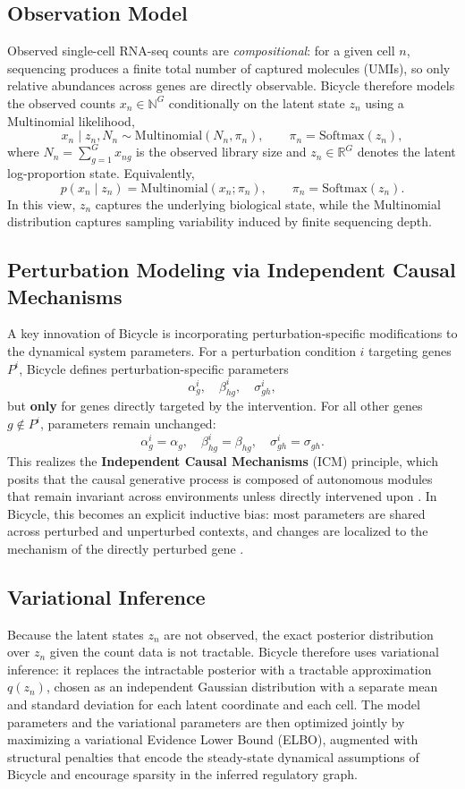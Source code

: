 \documentclass[12pt]{article}
\begin{document}
\subsection{Observation Model}
Observed single-cell RNA-seq counts are \emph{compositional}: for a given cell \(n\), sequencing produces a finite
total number of captured molecules (UMIs), so only relative abundances across genes are directly
observable. Bicycle therefore models the observed counts \(x_n \in \mathbb{N}^G\) conditionally on the
latent state \(z_n\) using a Multinomial likelihood,
\[
x_n \mid z_n, N_n \sim \mathrm{Multinomial}(N_n,\pi_n),
\qquad
\pi_n = \mathrm{Softmax}(z_n),
\]
where \(N_n = \sum_{g=1}^G x_{ng}\) is the observed library size and \(z_n \in \mathbb{R}^G\) denotes the
latent log-proportion state. Equivalently,
\[
p(x_n \mid z_n) = \mathrm{Multinomial}(x_n; \pi_n),
\qquad
\pi_n = \mathrm{Softmax}(z_n).
\]
In this view, \(z_n\) captures the underlying biological state, while the Multinomial distribution
captures sampling variability induced by finite sequencing depth.

\subsection{Perturbation Modeling via Independent Causal Mechanisms}
A key innovation of Bicycle is incorporating perturbation-specific modifications to the dynamical
system parameters. For a perturbation condition \(i\) targeting genes \(P^i\), Bicycle defines
perturbation-specific parameters
\[
\alpha^i_g, \quad
\beta^i_{hg}, \quad
\sigma^i_{gh},
\]
but \textbf{only} for genes directly targeted by the intervention. For all other genes
\(g \notin P^i\), parameters remain unchanged:
\[
\alpha^i_g = \alpha_g,\quad
\beta^i_{hg} = \beta_{hg},\quad
\sigma^i_{gh} = \sigma_{gh}.
\]
This realizes the \textbf{Independent Causal Mechanisms} (ICM) principle, which posits that
the causal generative process is composed of autonomous modules that remain invariant across
environments unless directly intervened upon \cite{peters2017elements,scholkopf2021causalrep}.
In Bicycle, this becomes an explicit inductive bias: most parameters are shared across perturbed
and unperturbed contexts, and changes are localized to the mechanism of the directly perturbed
gene \cite{rohbeck2024bicycle}.

\subsection{Variational Inference}
Because the latent states \(z_n\) are not observed, the exact posterior distribution over \(z_n\)
given the count data is not tractable. Bicycle therefore uses variational inference: it replaces the
intractable posterior with a tractable approximation \(q(z_n)\), chosen as an independent Gaussian
distribution with a separate mean and standard deviation for each latent coordinate and each cell.
The model parameters and the variational parameters are then optimized jointly by maximizing a
variational Evidence Lower Bound (ELBO), augmented with structural penalties that encode the
steady-state dynamical assumptions of Bicycle and encourage sparsity in the inferred regulatory
graph. 
\end{document}
